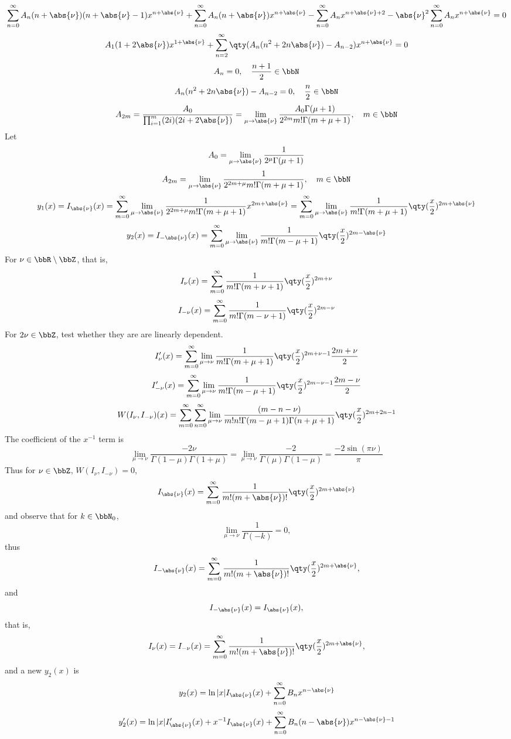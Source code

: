 \documentclass[a4paper,12pt]{report}
\begin{document}
\[\sum_{n=0}^{\infty}A_n(n+\abs{\nu})(n+\abs{\nu}-1)x^{n+\abs{\nu}}+\sum_{n=0}^{\infty}A_n(n+\abs{\nu})x^{n+\abs{\nu}}-\sum_{n=0}^{\infty}A_nx^{n+\abs{\nu}+2}-\abs{\nu}^2\sum_{n=0}^{\infty}A_nx^{n+\abs{\nu}}=0\]
\[A_1(1+2\abs{\nu})x^{1+\abs{\nu}}+\sum_{n=2}^{\infty}\qty(A_n(n^2+2n\abs{\nu})-A_{n-2})x^{n+\abs{\nu}}=0\]
\[A_n=0,\quad\frac{n+1}{2}\in\bbN\]
\[A_n(n^2+2n\abs{\nu})-A_{n-2}=0,\quad\frac{n}{2}\in\bbN\]
\[A_{2m}=\frac{A_0}{\prod_{i=1}^m(2i)(2i+2\abs{\nu})}=\lim_{\mu\to\abs{\nu}}\frac{A_0\Gamma(\mu+1)}{2^{2m}m!\Gamma(m+\mu+1)},\quad m\in\bbN\]
Let
\[A_0=\lim_{\mu\to\abs{\nu}}\frac{1}{2^\mu\Gamma(\mu+1)}\]
\[A_{2m}=\lim_{\mu\to\abs{\nu}}\frac{1}{2^{2m+\mu}m!\Gamma(m+\mu+1)},\quad m\in\bbN\]
\[y_1(x)=I_{\abs{\nu}}(x)=\sum_{m=0}^{\infty}\lim_{\mu\to\abs{\nu}}\frac{1}{2^{2m+\mu}m!\Gamma(m+\mu+1)}x^{2m+\abs{\nu}}=\sum_{m=0}^{\infty}\lim_{\mu\to\abs{\nu}}\frac{1}{m!\Gamma(m+\mu+1)}\qty(\frac{x}{2})^{2m+\abs{\nu}}\]
\[y_2(x)=I_{-\abs{\nu}}(x)=\sum_{m=0}^{\infty}\lim_{\mu\to\abs{\nu}}\frac{1}{m!\Gamma(m-\mu+1)}\qty(\frac{x}{2})^{2m-\abs{\nu}}\]
For $\nu\in\bbR\setminus\bbZ$, that is,
\[I_{\nu}(x)=\sum_{m=0}^{\infty}\frac{1}{m!\Gamma(m+\nu+1)}\qty(\frac{x}{2})^{2m+\nu}\]
\[I_{-\nu}(x)=\sum_{m=0}^{\infty}\frac{1}{m!\Gamma(m-\nu+1)}\qty(\frac{x}{2})^{2m-\nu}\]
For $2\nu\in\bbZ$, test whether they are are linearly dependent.
\[I_{\nu}'(x)=\sum_{m=0}^{\infty}\lim_{\mu\to\nu}\frac{1}{m!\Gamma(m+\mu+1)}\qty(\frac{x}{2})^{2m+\nu-1}\frac{2m+\nu}{2}\]
\[I_{-\nu}'(x)=\sum_{m=0}^{\infty}\lim_{\mu\to\nu}\frac{1}{m!\Gamma(m-\mu+1)}\qty(\frac{x}{2})^{2m-\nu-1}\frac{2m-\nu}{2}\]
\[W(I_{\nu},I_{-\nu})(x)=\sum_{m=0}^{\infty}\sum_{n=0}^{\infty}\lim_{\mu\to\nu}\frac{(m-n-\nu)}{m!n!\Gamma(m-\mu+1)\Gamma(n+\mu+1)}\qty(\frac{x}{2})^{2m+2n-1}\]
The coefficient of the $x^{-1}$ term is
\[\lim_{\mu\to\nu}\frac{-2\nu}{\Gamma(1-\mu)\Gamma(1+\mu)}=\lim_{\mu\to\nu}\frac{-2}{\Gamma(\mu)\Gamma(1-\mu)}=\frac{-2\sin(\pi\nu)}{\pi}\]
Thus for $\nu\in\bbZ$, $W(I_{\nu},I_{-\nu})=0$,
\[I_{\abs{\nu}}(x)=\sum_{m=0}^{\infty}\frac{1}{m!(m+\abs{\nu})!}\qty(\frac{x}{2})^{2m+\abs{\nu}}\]
and observe that for $k\in\bbN_0$,
\[\lim_{\mu\to\nu}\frac{1}{\Gamma(-k)}=0,\]
thus
\[I_{-\abs{\nu}}(x)=\sum_{m=0}^{\infty}\frac{1}{m!(m+\abs{\nu})!}\qty(\frac{x}{2})^{2m+\abs{\nu}},\]
and
\[I_{-\abs{\nu}}(x)=I_{\abs{\nu}}(x),\]
that is,
\[I_{\nu}(x)=I_{-\nu}(x)=\sum_{m=0}^{\infty}\frac{1}{m!(m+\abs{\nu})!}\qty(\frac{x}{2})^{2m+\abs{\nu}},\]
and a new $y_2(x)$ is
\[y_2(x)=\ln|x|I_{\abs{\nu}}(x)+\sum_{n=0}^{\infty}B_nx^{n-\abs{\nu}}\]
\[y_2'(x)=\ln|x|I_{\abs{\nu}}'(x)+x^{-1}I_{\abs{\nu}}(x)+\sum_{n=0}^{\infty}B_n(n-\abs{\nu})x^{n-\abs{\nu}-1}\]
\end{document}
